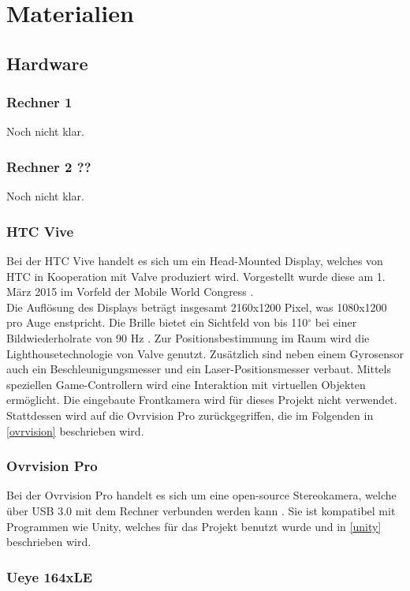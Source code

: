 \section{Materialien}
\subsection{Hardware}
\subsubsection{Rechner 1}
Noch nicht klar.
\subsubsection{Rechner 2 ??}
Noch nicht klar.
\subsubsection{HTC Vive}
Bei der HTC Vive handelt es sich um ein Head-Mounted Display, welches von HTC in Kooperation mit Valve \cite{website:Valve} produziert wird. Vorgestellt wurde diese am 1. März 2015 im Vorfeld der Mobile World Congress \cite{website:mobileworldcongress}.\\
Die Auflösung des Displays beträgt insgesamt 2160x1200 Pixel, was 1080x1200 pro Auge enstpricht. Die Brille bietet ein Sichtfeld von bis 110$^\circ$ bei einer Bildwiederholrate von 90 Hz \cite{website:HTC_Vive}. Zur Positionsbestimmung im Raum wird die  Lighthousetechnologie von Valve genutzt. Zusätzlich sind neben einem Gyrosensor auch ein Beschleunigungsmesser und ein Laser-Positionsmesser verbaut. Mittels speziellen Game-Controllern wird eine Interaktion mit virtuellen Objekten ermöglicht. Die eingebaute Frontkamera wird für dieses Projekt nicht verwendet. Stattdessen wird auf die Ovrvision Pro zurückgegriffen, die im Folgenden in \ref{ovrvision} beschrieben wird.

\subsubsection{Ovrvision Pro \label{ovrvision}}
Bei der Ovrvision Pro handelt es sich um eine open-source Stereokamera, welche über USB 3.0 mit dem Rechner verbunden werden kann \cite{website:ovrvision}. Sie ist kompatibel mit Programmen wie Unity, welches für das Projekt benutzt wurde und in \ref{unity} beschrieben wird. 



\subsubsection{Ueye 164xLE}


